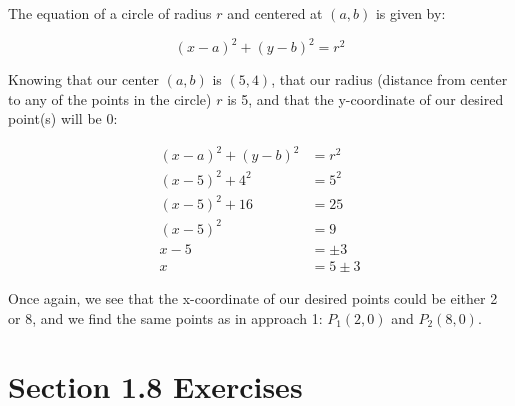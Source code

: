 \documentclass[12pt]{article}
\begin{document}
The equation of a circle of radius $r$ and centered at $(a, b)$ is given by:

\[
(x - a)^2 + (y - b)^2 = r^2
\]

Knowing that our center $(a, b)$ is $(5, 4)$, that our radius (distance from center to any of the points in the circle) $r$ is 5, and that the y-coordinate of our desired point(s) will be 0:

\begin{align*}
    (x - a)^2 + (y - b)^2 &= r^2\\
    (x - 5)^2 + 4^2 &= 5^2\\
    (x - 5)^2 + 16 &= 25\\
    (x - 5)^2 &= 9\\
    x - 5 &= \pm 3\\
    x &= 5 \pm 3
\end{align*}

Once again, we see that the x-coordinate of our desired points could be either 2 or 8, and we find the same points as in approach 1: $P_1(2, 0)$ and $P_2(8, 0)$.

\section*{Section 1.8 Exercises}
\end{document}
